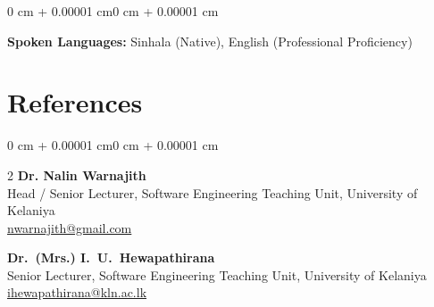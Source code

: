 \documentclass[10pt, letterpaper]{article}
\newenvironment{onecolentry}{
    \begin{adjustwidth}{0 cm + 0.00001 cm}{0 cm + 0.00001 cm}
}{
    \end{adjustwidth}
}
\let\hrefWithoutArrow\href
\begin{document}
\vspace{0.08 cm}
\begin{onecolentry}
\textbf{Spoken Languages:} Sinhala (Native), English (Professional Proficiency)
\end{onecolentry}

\section{References}

\begin{onecolentry}
\begin{paracol}{2}
    \textbf{Dr. Nalin Warnajith}\\
    Head / Senior Lecturer, Software Engineering Teaching Unit, University of Kelaniya\\
    \hrefWithoutArrow{mailto:nwarnajith@gmail.com}{nwarnajith@gmail.com}

    \switchcolumn

    \textbf{Dr.\ (Mrs.) I.\ U.\ Hewapathirana}\\
    Senior Lecturer, Software Engineering Teaching Unit, University of Kelaniya\\
    \hrefWithoutArrow{mailto:ihewapathirana@kln.ac.lk}{ihewapathirana@kln.ac.lk}
\end{paracol}
\end{onecolentry}
\end{document}
